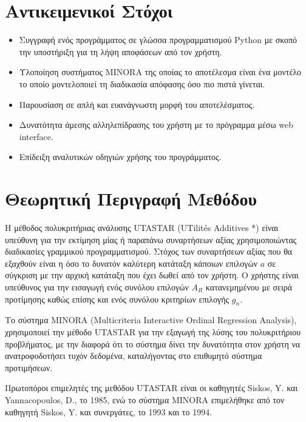 \documentclass[11pt,a4paper,titlepage]{article}
\numberwithin{equation}{section}
\begin{document}

\section{Αντικειμενικοί Στόχοι}
\label{sec:goals}   
\begin{itemize}
	\item Συγγραφή ενός προγράμματος σε γλώσσα προγραμματισμού Python με σκοπό την υποστήριξη για τη λήψη αποφάσεων από τον χρήστη.
	\item Υλοποίηση συστήματος MINORA της οποίας το αποτέλεσμα είναι ένα μοντέλο το οποίο μοντελοποιεί τη διαδικασία απόφασης όσο πιο πιστά γίνεται.
	\item Παρουσίαση σε απλή και ευανάγνωστη μορφή του αποτελέσματος.
	\item Δυνατότητα άμεσης αλληλεπίδρασης του χρήστη με το πρόγραμμα μέσω web interface.
	\item Επίδειξη αναλυτικών οδηγιών χρήσης του προγράμματος.
\end{itemize}


\section{Θεωρητική Περιγραφή Μεθόδου}
\label{sec:theory}
Η μέθοδος πολυκριτήριας ανάλυσης UTASTAR (UTilités Additives *) είναι υπεύθυνη για την εκτίμηση μίας ή παραπάνω συναρτήσεων αξίας χρησιμοποιώντας διαδικασίες γραμμικού προγραμματισμού. Στόχος των συναρτήσεων αξίας που θα εξαχθούν είναι η όσο το δυνατόν καλύτερη κατάταξη κάποιων επιλογών $a$ σε σύγκριση με την αρχική κατάταξη που έχει δωθεί από τον χρήστη. Ο χρήστης είναι υπεύθυνος για την εισαγωγή ενός συνόλου επιλογών $A_{R}$ κατανεμημένου με σειρά προτίμησης καθώς επίσης και ενός συνόλου κριτηρίων επιλογής $g_{n}$. 

Το σύστημα MINORA (Multicriteria Interactive Ordinal Regression Analysis), χρησιμοποιεί την μέθοδο UTASTAR για την εξαγωγή της λύσης του πολυκριτήριου προβλήματος, με την διαφορά ότι το σύστημα δίνει την δυνατότητα στον χρήστη να ανατροφοδοτήσει τυχόν δεδομένα, καταλήγοντας στο επιθυμητό σύστημα προτιμήσεων.

Πρωτοπόροι επιμελητές της μεθόδου UTASTAR είναι οι καθηγητές Siskos, Y. και Yannacopoulos, D., το 1985, ενώ το σύστημα MINORA επιμελήθηκε από τον καθηγητή Siskos, Y. και συνεργάτες, το 1993 και το 1994. 
\end{document}
